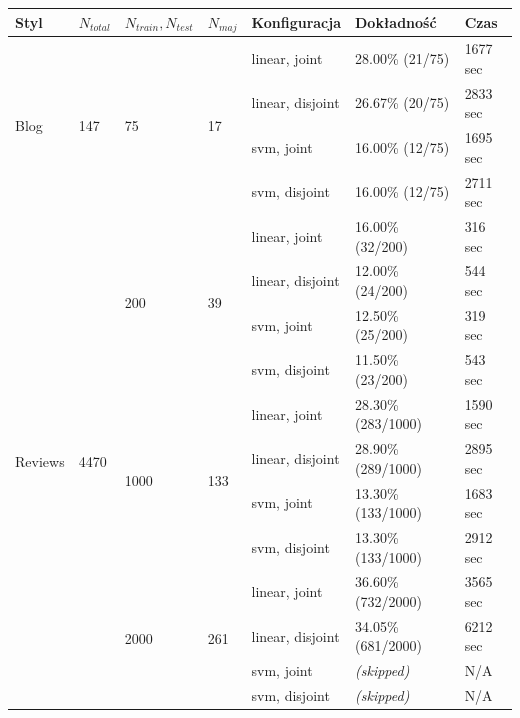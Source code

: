 \documentclass{article}
\begin{document}
\begin{adjustwidth}{-4cm}{-0cm}

\begin{tabular}{|p{2cm}|p{2cm}|p{2cm}|p{2cm}|p{3cm}|p{3cm}|p{3cm}|}

\hline

\textbf{Styl} & \textbf{$N_{total}$} & \textbf{$N_{train}, N_{test}$} & $N_{maj}$ & \textbf{Konfiguracja} & \textbf{Dokładność} & \textbf{Czas} \\  \hline


\multirow{4}{*}{Blog} & \multirow{4}{*}{147}	& \multirow{4}{*}{75} & \multirow{4}{*}{17} & 
linear, joint & 28.00\% (21/75) & 1677 sec \\  \cline{5-7}
& & & & 
linear, disjoint & 26.67\% (20/75) & 2833 sec \\  \cline{5-7}
& & & & 
svm, joint & 16.00\% (12/75) & 1695 sec \\  \cline{5-7}
& & & & 
svm, disjoint & 16.00\% (12/75) & 2711 sec \\  \hline


\multirow{12}{*}{Reviews} & \multirow{12}{*}{4470} & \multirow{4}{*}{200} & \multirow{4}{*}{39} & 
linear, joint & 16.00\% (32/200) & 316 sec \\  \cline{5-7}
& & & & 
linear, disjoint & 12.00\% (24/200) & 544 sec \\  \cline{5-7}
& & & & 
svm, joint & 12.50\% (25/200) & 319 sec \\  \cline{5-7}
& & & & 
svm, disjoint & 11.50\% (23/200) & 543 sec \\  \cline{3-7}

& & \multirow{4}{*}{1000} & \multirow{4}{*}{133} & 
linear, joint & 28.30\% (283/1000) & 1590 sec \\  \cline{5-7}
& & & & 
linear, disjoint & 28.90\% (289/1000) & 2895 sec \\  \cline{5-7}
& & & & 
svm, joint & 13.30\% (133/1000) & 1683 sec \\  \cline{5-7}
& & & & 
svm, disjoint & 13.30\% (133/1000) & 2912 sec \\  \cline{3-7}

& & \multirow{4}{*}{2000} & \multirow{4}{*}{261} & 
linear, joint & 36.60\% (732/2000) & 3565 sec \\  \cline{5-7}
& & & & 
linear, disjoint & 34.05\% (681/2000) & 6212 sec \\  \cline{5-7}
& & & & 
svm, joint & \textit{(skipped)} & N/A \\  \cline{5-7}
& & & & 
svm, disjoint & \textit{(skipped)} & N/A \\  \hline



\end{tabular}
\end{adjustwidth}
\end{document}
